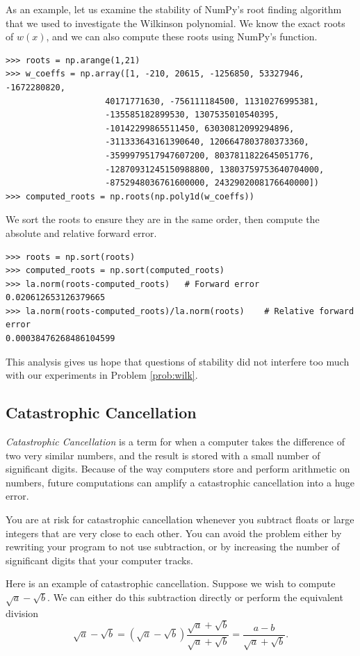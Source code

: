 As an example, let us examine the stability of NumPy's root finding algorithm that we used to investigate the Wilkinson polynomial.
We know the exact roots of $w(x)$, and we can also compute these roots using NumPy's  function.
\begin{lstlisting}
>>> roots = np.arange(1,21)
>>> w_coeffs = np.array([1, -210, 20615, -1256850, 53327946, -1672280820,
                    40171771630, -756111184500, 11310276995381,
                    -135585182899530, 1307535010540395,
                    -10142299865511450, 63030812099294896,
                    -311333643161390640, 1206647803780373360,
                    -3599979517947607200, 8037811822645051776,
                    -12870931245150988800, 13803759753640704000,
                    -8752948036761600000, 2432902008176640000])
>>> computed_roots = np.roots(np.poly1d(w_coeffs))
\end{lstlisting}
We sort the roots to ensure they are in the same order, then compute the absolute and relative forward error.
\begin{lstlisting}
>>> roots = np.sort(roots)
>>> computed_roots = np.sort(computed_roots)
>>> la.norm(roots-computed_roots)	# Forward error
0.020612653126379665
>>> la.norm(roots-computed_roots)/la.norm(roots)	# Relative forward error
0.00038476268486104599
\end{lstlisting}

This analysis gives us hope that questions of stability did not interfere too much with our experiments in Problem \ref{prob:wilk}.

\subsection*{Catastrophic Cancellation}
\emph{Catastrophic Cancellation} is a term for when a computer takes the difference of two very similar numbers, and the result is stored with a small number of significant digits.
Because of the way computers store and perform arithmetic on numbers, future computations can amplify a catastrophic cancellation into a huge error.

You are at risk for catastrophic cancellation whenever you subtract floats or large integers that are very close to each other.
You can avoid the problem either by rewriting your program to not use subtraction, or by increasing the number of significant digits that your computer tracks.

Here is an example of catastrophic cancellation.
Suppose we wish to compute $\sqrt{a}-\sqrt{b}$. We can either do this subtraction directly or perform the equivalent division
\[
\sqrt{a}-\sqrt{b} = (\sqrt{a}-\sqrt{b})\frac{\sqrt{a}+\sqrt{b}}{\sqrt{a}+\sqrt{b}} = \frac{a-b}{\sqrt{a}+\sqrt{b}}.
\]

